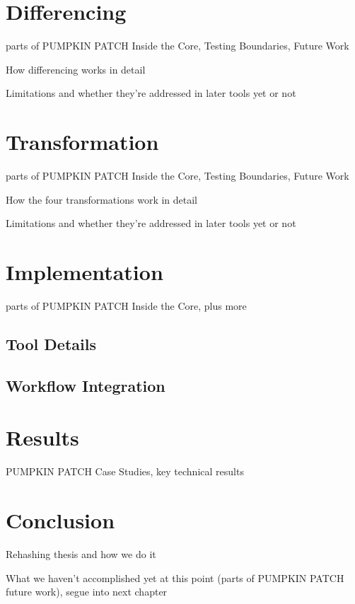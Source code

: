 \section{Differencing}

parts of PUMPKIN PATCH Inside the Core, Testing Boundaries, Future Work

How differencing works in detail

Limitations and whether they're addressed in later tools yet or not

\section{Transformation}

parts of PUMPKIN PATCH Inside the Core, Testing Boundaries, Future Work

How the four transformations work in detail

Limitations and whether they're addressed in later tools yet or not

\section{Implementation}

parts of PUMPKIN PATCH Inside the Core, plus more

\subsection{Tool Details}

\subsection{Workflow Integration}

\section{Results}

PUMPKIN PATCH Case Studies, key technical results

\section{Conclusion}

Rehashing thesis and how we do it

What we haven't accomplished yet at this point (parts of PUMPKIN PATCH future work), segue into next chapter


%

%

%

%

%

%

%

%

